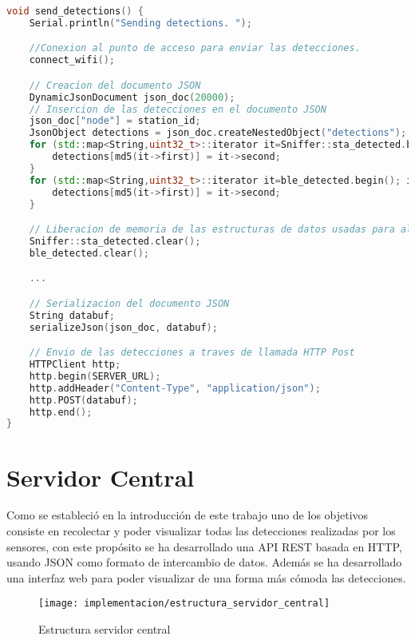 \documentclass[../proyecto.tex]{subfiles}
\begin{document}
\begin{lstlisting}[language=C++, caption=Envío de detecciones al servidor central , captionpos=b, frame=single, label={lst:envio_detecciones}]
void send_detections() {
    Serial.println("Sending detections. ");

    //Conexion al punto de acceso para enviar las detecciones.
    connect_wifi();

    // Creacion del documento JSON
    DynamicJsonDocument json_doc(20000);
    // Insercion de las detecciones en el documento JSON
    json_doc["node"] = station_id;
    JsonObject detections = json_doc.createNestedObject("detections");
    for (std::map<String,uint32_t>::iterator it=Sniffer::sta_detected.begin(); it!=Sniffer::sta_detected.end(); ++it) {
        detections[md5(it->first)] = it->second;
    }
    for (std::map<String,uint32_t>::iterator it=ble_detected.begin(); it!=ble_detected.end(); ++it) {
        detections[md5(it->first)] = it->second;
    }

    // Liberacion de memoria de las estructuras de datos usadas para almacenar las detecciones.
    Sniffer::sta_detected.clear();
    ble_detected.clear();

    ...

    // Serializacion del documento JSON
    String databuf;
    serializeJson(json_doc, databuf);

    // Envio de las detecciones a traves de llamada HTTP Post
    HTTPClient http;
    http.begin(SERVER_URL);
    http.addHeader("Content-Type", "application/json");
    http.POST(databuf);
    http.end();
}
\end{lstlisting}

\section{Servidor Central}\label{sect:impementacion_servidor_central}

Como se estableció en la introducción de este trabajo uno de los objetivos consiste en recolectar y poder visualizar todas las detecciones realizadas por los sensores, con este propósito se ha desarrollado una API REST basada en HTTP, usando JSON como formato de intercambio de datos. Además se ha desarrollado una interfaz web para poder visualizar de una forma más cómoda las detecciones.\\

\begin{figure}[H]
\centering
\texttt{[image: implementacion/estructura\_servidor\_central]}
\caption{Estructura servidor central }
\label{fig:estructura_servidor_central}
\end{figure}
\end{document}
